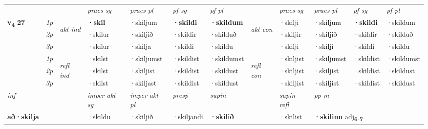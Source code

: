 \begin{longtable}[l]{X>{\footnotesize\itshape}llXXXXlXXXX}
 & &   & \textit{praes sg}  & \textit{praes pl}    & \textit{ pf sg} & \textit{pf pl} & & \textit{praes sg}  & \textit{praes pl}    & \textit{pf sg} & \textit{pf pl }  \\ \cmidrule{4-7} \cmidrule{9-12}
 \multirow{2}{*}{{{\textbf{v{\textsubscript{4}}} \Large{\textbf{27}}}}}  & 1p & \multirow{3}{*}{\begin{turn}{90}\textit{akt ind}\end{turn}} & \textbf{·skil} & ·skiljum & \textbf{·skildi} & \textbf{·skildum} & \multirow{3}{*}{\begin{turn}{90}\textit{akt con}\end{turn}} &·skilji & ·skiljum & \textbf{·skildi} & ·skildum\\*
 & 2p &  &  ·skilur  & ·skiljið & ·skildir & ·skilduð & & ·skiljir & ·skiljið & ·skildir & ·skilduð \\*
 & 3p &  & ·skilur & ·skilja & ·skildi & ·skildu & & ·skilji & ·skilji& ·skildi & ·skildu \\*
\cmidrule{4-7} \cmidrule{9-12}
 & 1p & \multirow{3}{*}{\begin{turn}{90}\textit{refl ind}\end{turn}}  & ·skilst & ·skiljumst & ·skildist & ·skildumst & \multirow{3}{*}{\begin{turn}{90}\textit{refl con}\end{turn}}  &·skiljist & ·skiljumst & ·skildist & ·skildumst \\*
 & 2p &  & ·skilst & ·skiljist & ·skildist & ·skildust & &·skiljist & ·skiljist & ·skildist & ·skildust \\*
 & 3p  & & ·skilst & ·skiljast & ·skildist & ·skildust & & ·skiljist & ·skiljist& ·skildist & ·skildust \\*
\cmidrule{4-7} \cmidrule{9-12}

   {\textit{inf}} & &  & \textit{imper akt sg} & \textit{imper akt pl}   & \textit{presp} & \textit{supin} && \textit{supin refl} & \textit{pp m} \\*
  {\textbf{að\allowbreak ·skilja}} & && ·skildu  & ·skiljið   & ·skiljandi &  \textbf{·skilið} && ·skilist & \multicolumn{2}{l}{\textbf{·skilinn} adj\textbf{\textsubscript{6-7}}} \\*

\midrule


\end{longtable}
